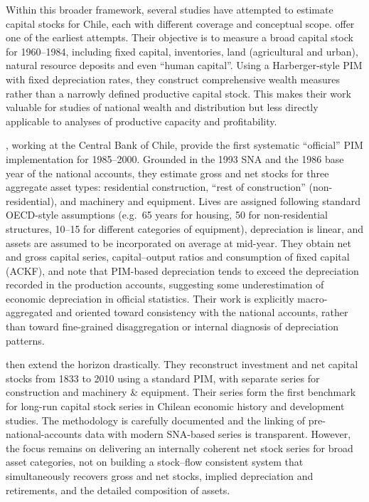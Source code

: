 \documentclass[11pt,a4paper]{article}
\begin{document}
Within this broader framework, several studies have attempted to estimate capital stocks for Chile, each with different coverage and conceptual scope. \citet{Haindl1986} offer one of the earliest attempts. Their objective is to measure a broad capital stock for 1960--1984, including fixed capital, inventories, land (agricultural and urban), natural resource deposits and even ``human capital''. Using a Harberger-style PIM with fixed depreciation rates, they construct comprehensive wealth measures rather than a narrowly defined productive capital stock. This makes their work valuable for studies of national wealth and distribution but less directly applicable to analyses of productive capacity and profitability.

\citet{Aguilar2001}, working at the Central Bank of Chile, provide the first systematic ``official'' PIM implementation for 1985--2000. Grounded in the 1993 SNA and the 1986 base year of the national accounts, they estimate gross and net stocks for three aggregate asset types: residential construction, ``rest of construction'' (non-residential), and machinery and equipment. Lives are assigned following standard OECD-style assumptions (e.g.\ 65 years for housing, 50 for non-residential structures, 10--15 for different categories of equipment), depreciation is linear, and assets are assumed to be incorporated on average at mid-year. They obtain net and gross capital series, capital--output ratios and consumption of fixed capital (ACKF), and note that PIM-based depreciation tends to exceed the depreciation recorded in the production accounts, suggesting some underestimation of economic depreciation in official statistics. Their work is explicitly macro-aggregated and oriented toward consistency with the national accounts, rather than toward fine-grained disaggregation or internal diagnosis of depreciation patterns.

\citet{DiazWagner2016} then extend the horizon drastically. They reconstruct investment and net capital stocks from 1833 to 2010 using a standard PIM, with separate series for construction and machinery \& equipment. Their series form the first  benchmark for long-run capital stock series in Chilean economic history and development studies. The methodology is carefully documented and the linking of pre-national-accounts data with modern SNA-based series is transparent. However, the focus remains on delivering an internally coherent net stock series for broad asset categories, not on building a stock--flow consistent system that simultaneously recovers gross and net stocks, implied depreciation and retirements, and the detailed composition of assets.
\end{document}
